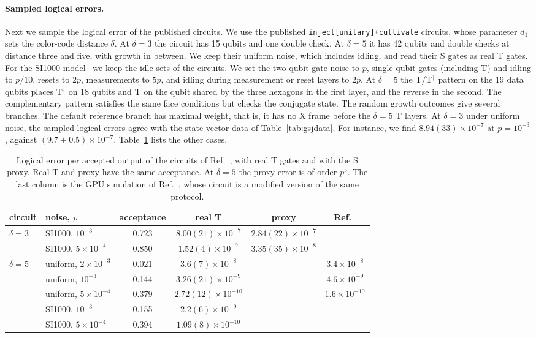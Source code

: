\documentclass[aps,prl,reprint,twocolumn,amsmath,amssymb,floatfix,nofootinbib,superscriptaddress]{revtex4-2}
\theoremstyle{definition}
\theoremstyle{remark}
\begin{document}
\paragraph*{Sampled logical errors.}
Next we sample the logical error of the published circuits. We use the published \texttt{inject[unitary]+cultivate} circuits, whose parameter $d_1$ sets the color-code distance $\delta$. At $\delta=3$ the circuit has 15 qubits and one double check. At $\delta=5$ it has 42 qubits and double checks at distance three and five, with growth in between. We keep their uniform noise, which includes idling, and read their S gates as real T gates. For the SI1000 model~\cite{si1000} we keep the idle sets of the circuits. We set the two-qubit gate noise to $p$, single-qubit gates (including T) and idling to $p/10$, resets to $2p$, measurements to $5p$, and idling during measurement or reset layers to $2p$. At $\delta=5$ the T/T$^\dagger$ pattern on the 19 data qubits places T$^\dagger$ on 18 qubits and T on the qubit shared by the three hexagons in the first layer, and the reverse in the second. The complementary pattern satisfies the same face conditions but checks the conjugate state. The random growth outcomes give several branches. The default reference branch has maximal weight, that is, it has no X frame before the $\delta=5$ T layers. At $\delta=3$ under uniform noise, the sampled logical errors agree with the state-vector data of Table~\ref{tab:gsjdata}. For instance, we find $8.94(33)\times10^{-7}$ at $p=10^{-3}$, against $(9.7\pm0.5)\times10^{-7}$. Table~\ref{tab:rates} lists the other cases.

\begin{table}[h]
\caption{Logical error per accepted output of the circuits of Ref.~\cite{cultivation}, with real T gates and with the S proxy. Real T and proxy have the same acceptance. At $\delta=5$ the proxy error is of order $p^5$. The last column is the GPU simulation of Ref.~\cite{soft}, whose circuit is a modified version of the same protocol.}
\label{tab:rates}
\begin{ruledtabular}
\begin{tabular}{llcccc}
circuit & noise, $p$ & acceptance & real T & proxy & Ref.~\cite{soft} \\
\hline
$\delta=3$ & SI1000, $10^{-3}$ & 0.723 & $8.00(21)\times10^{-7}$ & $2.84(22)\times10^{-7}$ & \\
 & SI1000, $5\times10^{-4}$ & 0.850 & $1.52(4)\times10^{-7}$ & $3.35(35)\times10^{-8}$ & \\
$\delta=5$ & uniform, $2\times10^{-3}$ & 0.021 & $3.6(7)\times10^{-8}$ & & $3.4\times10^{-8}$ \\
 & uniform, $10^{-3}$ & 0.144 & $3.26(21)\times10^{-9}$ & & $4.6\times10^{-9}$ \\
 & uniform, $5\times10^{-4}$ & 0.379 & $2.72(12)\times10^{-10}$ & & $1.6\times10^{-10}$ \\
 & SI1000, $10^{-3}$ & 0.155 & $2.2(6)\times10^{-9}$ & & \\
 & SI1000, $5\times10^{-4}$ & 0.394 & $1.09(8)\times10^{-10}$ & & \\
\end{tabular}
\end{ruledtabular}
\end{table}
\end{document}
